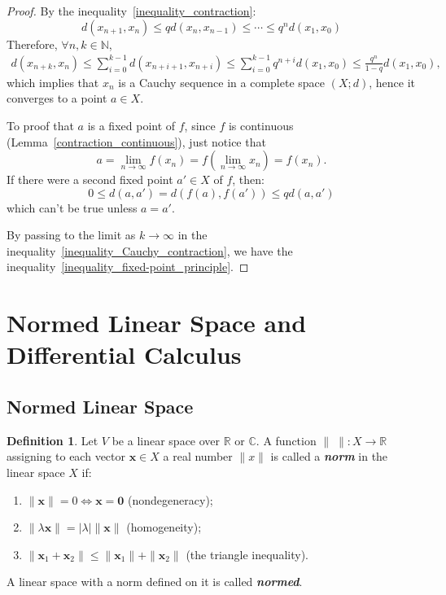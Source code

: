 \documentclass[openany]{book}
\newcommand*{\indexbf}[1]{\emph{\textbf{#1}}\index{#1}} %
\theoremstyle{plain}
\theoremstyle{definition}
\newtheorem{definition}{Definition}[section] %
\begin{document}
\begin{proof}
By the inequality~\ref{inequality_contraction}:
\[
d ( x_{n+1}, x_n) \leq q d( x_n, x_{n-1})
\leq \cdots 
\leq q^n d( x_1, x_0)
\]
Therefore, $\forall n, k \in \mathbb{N}$, 
\begin{align}\label{inequality_Cauchy_contraction}
	d ( x_{n+k}, x_n) \leq 
	\sum^{k-1}_{i=0} d( x_{n+i+1}, x_{n+i}) \leq
	\sum^{k-1}_{i=0} q^{n+i} d( x_1, x_0) \leq
	\frac{q^n}{1-q} d( x_1, x_0),
\end{align}
which implies that ${ x_n}$ is a Cauchy sequence in a complete space $(X;d)$, hence it converges to a point $a \in X$.

To proof that $a$ is a fixed point of $f$, since $f$ is continuous (Lemma~\ref{contraction_continuous}), just notice that 
\[
	a = \lim_{n\to \infty} f(x_n) = 
	f( \lim_{n\to \infty} x_n) = f( x_n).
\]
If there were a second fixed point $a'\in X$ of $f$, then:
\[
	0 \leq d( a, a')  = d( f(a), f(a') ) \leq q d( a, a')
\]
which can't be true unless $a = a'$. 

By passing to the limit as $k \to \infty$ in the inequality~\ref{inequality_Cauchy_contraction}, we have the inequality~\ref{inequality_fixed-point_principle}.
\end{proof}

\section{Normed Linear Space and Differential Calculus}
\subsection{Normed Linear Space}
\begin{definition}
Let $V$ be a linear space over $\mathbb{R}$ or $\mathbb{C}$. A function $\|\;\|: X\to \mathbb{R}$ assigning to each vector $\boldsymbol{x}\in X$ a real number $\|x\|$ is called a \indexbf{norm} in the linear space $X$ if:
\begin{enumerate}[label=\alph*)]
	\item 
	$\|\boldsymbol{x}\|=0\Leftrightarrow \boldsymbol{x}=\boldsymbol{0}$ (nondegeneracy);
	\item
	$\|\lambda \boldsymbol{x}\| = |\lambda|\|\boldsymbol{x}\|$ (homogeneity);
	\item
	$\|\boldsymbol{x}_1+\boldsymbol{x}_2\|\leq 
	\|\boldsymbol{x}_1\|+\|\boldsymbol{x}_2\|$ (the triangle inequality).
\end{enumerate}	
A linear space with a norm defined on it is called \indexbf{normed}.
\end{definition}

\backmatter
\nocite{*} %
\printbibliography[heading=bibliography, title={Bibliography}]


\printindex
\end{document}
